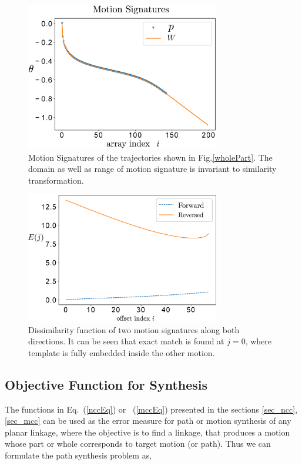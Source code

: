 \documentclass[twocolumn,10pt]{asme2e}
\newcommand{\req}[1]{(\ref{#1})}
\begin{document}
\begin{figure}
\centering
\includegraphics[width=240pt]{figure/fig_motion_signatures.eps}
  \caption{Motion Signatures of the trajectories shown in Fig.\ref{wholePart}. The domain as well as range of motion signature is invariant to similarity transformation.}
\label{motionSignature}
\end{figure}

\begin{figure}
\centering
\includegraphics[width=240pt]{figure/fig_mcc.eps}
  \caption{Dissimilarity function of two motion signatures along both directions. It can be seen that exact match is found at $j=0$, where template is fully embedded inside the other motion.}
\label{mcc}
\end{figure}

\subsection{Objective Function for Synthesis}
The functions in Eq.~\req{nccEq} or ~\req{mccEq} presented in the sections \ref{sec_ncc}, \ref{sec_mcc} can be used as the error measure for path or motion synthesis of any planar linkage, where the objective is to find a linkage, that produces a motion whose part or whole corresponds to target motion (or path).
Thus we can formulate the path synthesis problem as,
\end{document}
